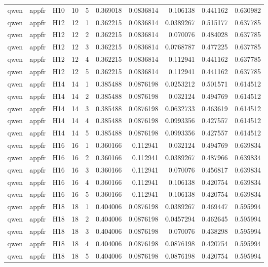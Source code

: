 \begin{longtable}{lllrrrrrrr}
qwen & appfr & H10 & 10 & 5 & 0.369018 & 0.0836814 & 0.106138 & 0.441162 & 0.630982 \\
qwen & appfr & H12 & 12 & 1 & 0.362215 & 0.0836814 & 0.0389267 & 0.515177 & 0.637785 \\
qwen & appfr & H12 & 12 & 2 & 0.362215 & 0.0836814 & 0.070076 & 0.484028 & 0.637785 \\
qwen & appfr & H12 & 12 & 3 & 0.362215 & 0.0836814 & 0.0768787 & 0.477225 & 0.637785 \\
qwen & appfr & H12 & 12 & 4 & 0.362215 & 0.0836814 & 0.112941 & 0.441162 & 0.637785 \\
qwen & appfr & H12 & 12 & 5 & 0.362215 & 0.0836814 & 0.112941 & 0.441162 & 0.637785 \\
qwen & appfr & H14 & 14 & 1 & 0.385488 & 0.0876198 & 0.0253212 & 0.501571 & 0.614512 \\
qwen & appfr & H14 & 14 & 2 & 0.385488 & 0.0876198 & 0.032124 & 0.494769 & 0.614512 \\
qwen & appfr & H14 & 14 & 3 & 0.385488 & 0.0876198 & 0.0632733 & 0.463619 & 0.614512 \\
qwen & appfr & H14 & 14 & 4 & 0.385488 & 0.0876198 & 0.0993356 & 0.427557 & 0.614512 \\
qwen & appfr & H14 & 14 & 5 & 0.385488 & 0.0876198 & 0.0993356 & 0.427557 & 0.614512 \\
qwen & appfr & H16 & 16 & 1 & 0.360166 & 0.112941 & 0.032124 & 0.494769 & 0.639834 \\
qwen & appfr & H16 & 16 & 2 & 0.360166 & 0.112941 & 0.0389267 & 0.487966 & 0.639834 \\
qwen & appfr & H16 & 16 & 3 & 0.360166 & 0.112941 & 0.070076 & 0.456817 & 0.639834 \\
qwen & appfr & H16 & 16 & 4 & 0.360166 & 0.112941 & 0.106138 & 0.420754 & 0.639834 \\
qwen & appfr & H16 & 16 & 5 & 0.360166 & 0.112941 & 0.106138 & 0.420754 & 0.639834 \\
qwen & appfr & H18 & 18 & 1 & 0.404006 & 0.0876198 & 0.0389267 & 0.469447 & 0.595994 \\
qwen & appfr & H18 & 18 & 2 & 0.404006 & 0.0876198 & 0.0457294 & 0.462645 & 0.595994 \\
qwen & appfr & H18 & 18 & 3 & 0.404006 & 0.0876198 & 0.070076 & 0.438298 & 0.595994 \\
qwen & appfr & H18 & 18 & 4 & 0.404006 & 0.0876198 & 0.0876198 & 0.420754 & 0.595994 \\
qwen & appfr & H18 & 18 & 5 & 0.404006 & 0.0876198 & 0.0876198 & 0.420754 & 0.595994 \\

\end{longtable}
